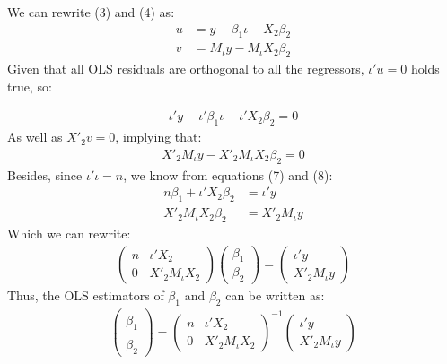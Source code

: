 \documentclass[12pt,onecolumn]{article}
\begin{document}
\begin{enumerate}
  We can rewrite (3) and (4) as:
  \begin{align}
      u &= y - \beta_1 \iota - X_2\beta_2 \\
      v &=  M_{\iota}y - M_{\iota}X_2\beta_2
  \end{align}
  Given that all OLS residuals are orthogonal to all the regressors, $\iota'u=0$ holds true, so: 
  
  \begin{align}
   \iota'y - \iota'\beta_1\iota - \iota'X_2\beta_2 = 0
  \end{align}
  As well as $X'_2v=0$, implying that: 
  \begin{align}
      X'_2M_{\iota}y - X'_2M_{\iota}X_2\beta_2 = 0
  \end{align}
  Besides, since $\iota'\iota=n$, we know from equations (7) and (8): 
  \begin{align}
       n\beta_1 + \iota'X_2\beta_2 &= \iota'y\\
       X'_2M_{\iota}X_2\beta_2 &= X'_2M_{\iota}y
  \end{align}
  Which we can rewrite: 
   \begin{align}
  \left(\begin{array}{cc}
    n & \iota'X_2\\
    0 & X'_2M_{\iota}X_2
    \end{array}\right)\left(\begin{array}{c}
    \beta_1\\
    \beta_2
    \end{array}\right)=\left(\begin{array}{c}
    \iota'y\\
    X'_2M_{\iota}y
    \end{array}\right)
  \end{align}
  Thus, the OLS estimators of $\beta_1$ and $\beta_2$ can be written as:
   \begin{align}
  \left(\begin{array}{c}
    \hat{\beta_1}\\
    \hat{\beta_2}
    \end{array}\right)=\left(\begin{array}{cc}
    n & \iota'X_2\\
    0 & X'_2M_{\iota}X_2
    \end{array}\right)^{-1}\left(\begin{array}{c}
    \iota'y\\
    X'_2M_{\iota}y
    \end{array}\right)
  \end{align}

\end{enumerate}
\end{document}
